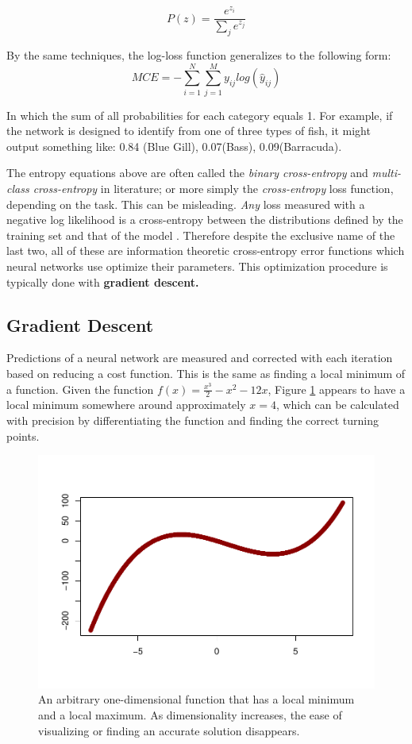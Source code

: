 $$
P(z) = \frac{e^{z_i}}{\sum_j{e^{z_j} }}
$$

By the same techniques, the log-loss function generalizes to the following form:
$$
MCE = -\sum_{i=1}^N \sum_{j=1}^M y_{ij} log (\hat{y}_{ij})
$$

In which the sum of all probabilities for each category equals 1.  For example, if the network is designed to identify from one of three types of fish, it might output something like:
0.84 (Blue Gill), 0.07(Bass), 0.09(Barracuda).

The entropy equations above are often called the \textit{binary cross-entropy} and \textit{multi-class cross-entropy} in literature; or more simply the \textit{cross-entropy} loss function, depending on the task. This can be misleading.  \textit{Any} loss measured with a negative log likelihood is a cross-entropy between the distributions defined by the training set and that of the model \cite{Goodfellow-et-al-2016}.
Therefore despite the exclusive name of the last two, all of these are information theoretic cross-entropy error functions which neural networks use optimize their parameters.  This optimization procedure is typically done with \textbf{gradient descent.}



\hypertarget{gradient-descent}{%
\subsection{Gradient Descent}\label{gradient-descent}}

Predictions of a neural network are measured and corrected with each
iteration based on reducing a cost function. This is the same as finding
a local minimum of a function.  Given the function \(f(x) = \frac{x^3}{2} - x^2 - 12x\), Figure \ref{red} appears to have a local minimum somewhere around approximately $x = 4$, which can be calculated with precision by differentiating the function and finding the correct turning points.

\begin{figure}[H]
    \centering
    \vspace{-40pt}
    \includegraphics[width = .7\textwidth]{Figures/grad_desc_2D-1.pdf}
    \vspace{-40pt}
    \caption{\footnotesize An arbitrary one-dimensional function that has a local minimum and a local maximum.  As dimensionality increases, the ease of visualizing or finding an accurate solution disappears.}
    \label{red}
\end{figure}

